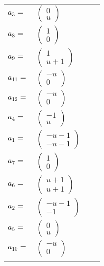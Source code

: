 \documentclass[1p]{elsarticle_modified}
\theoremstyle{definition}
\begin{document}
\begin{tabular}{m{7pt} m{180pt} m{7pt} m{180pt} }
\flushright $a_{3}=$&$\begin{pmatrix}0\\u\end{pmatrix}$ \\
\flushright $a_{8}=$&$\begin{pmatrix}1\\0\end{pmatrix}$ \\
\flushright $a_{9}=$&$\begin{pmatrix}1\\u+1\end{pmatrix}$ \\
\flushright $a_{11}=$&$\begin{pmatrix}- u\\0\end{pmatrix}$ \\
\flushright $a_{12}=$&$\begin{pmatrix}- u\\0\end{pmatrix}$ \\
\flushright $a_{4}=$&$\begin{pmatrix}-1\\u\end{pmatrix}$ \\
\flushright $a_{1}=$&$\begin{pmatrix}- u-1\\- u-1\end{pmatrix}$ \\
\flushright $a_{7}=$&$\begin{pmatrix}1\\0\end{pmatrix}$ \\
\flushright $a_{6}=$&$\begin{pmatrix}u+1\\u+1\end{pmatrix}$ \\
\flushright $a_{2}=$&$\begin{pmatrix}- u-1\\-1\end{pmatrix}$ \\
\flushright $a_{5}=$&$\begin{pmatrix}0\\u\end{pmatrix}$ \\
\flushright $a_{10}=$&$\begin{pmatrix}- u\\0\end{pmatrix}$\\&\end{tabular}
\end{document}

